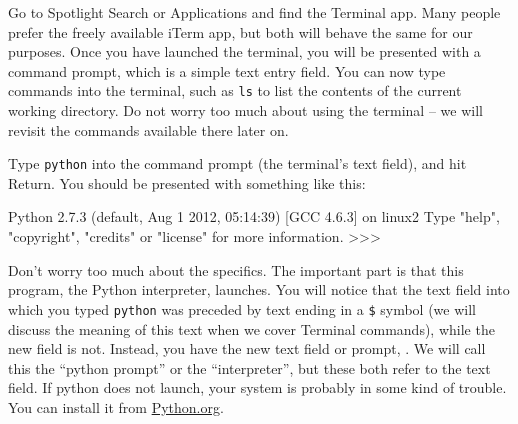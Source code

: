 

Go to Spotlight Search or Applications and find the Terminal app.
Many people prefer the freely available iTerm app, but both will behave the same for our purposes.
Once you have launched the terminal, you will be presented with a command prompt, which is a simple text entry field.
You can now type commands into the terminal, such as \texttt{ls} to list the contents of the current working directory.
Do not worry too much about using the terminal -- we will revisit the commands available there later on.

Type \texttt{python} into the command prompt (the terminal's text field), and hit Return.
You should be presented with something like this:
\begin{codeblock}
Python 2.7.3 (default, Aug  1 2012, 05:14:39)
[GCC 4.6.3] on linux2
Type "help", "copyright", "credits" or "license" for more information.
>>>
\end{codeblock}
Don't worry too much about the specifics.
The important part is that this program, the Python interpreter, launches.
You will notice that the text field into which you typed \texttt{python} was preceded by text ending in a \texttt{\$} symbol (we will discuss the meaning of this text when we cover Terminal commands), while the new field is not.
Instead, you have the new text field or prompt, \pyprompt.
We will call this the ``python prompt'' or the ``interpreter'', but these both refer to the \pyprompt text field.
If python does not launch, your system is probably in some kind of trouble.
You can install it from \href{http://www.python.org/getit/mac/}{Python.org}.

